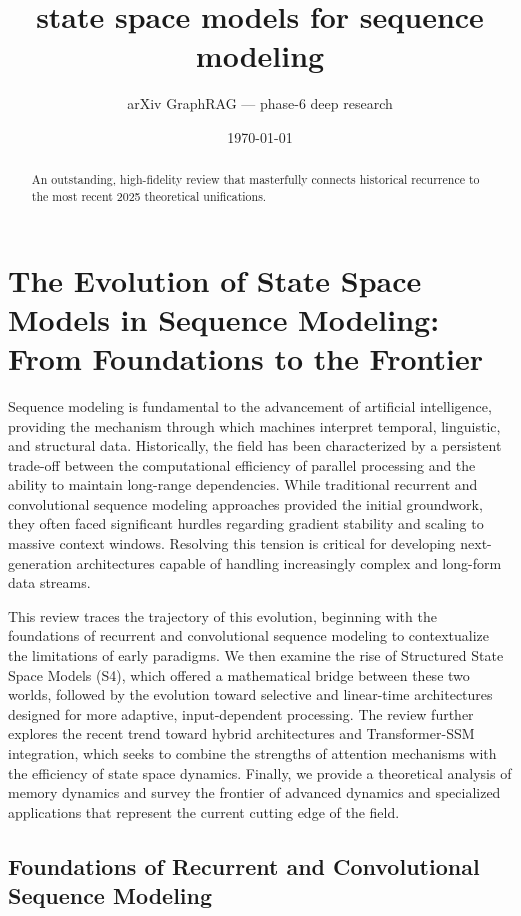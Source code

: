 \documentclass[11pt]{article}
\title{state space models for sequence modeling}
\author{arXiv GraphRAG --- phase-6 deep research}
\date{\today}
\begin{document}
\maketitle

\begin{abstract}
An outstanding, high-fidelity review that masterfully connects historical recurrence to the most recent 2025 theoretical unifications.
\end{abstract}

\section{The Evolution of State Space Models in Sequence Modeling: From Foundations to the Frontier}

Sequence modeling is fundamental to the advancement of artificial intelligence, providing the mechanism through which machines interpret temporal, linguistic, and structural data. Historically, the field has been characterized by a persistent trade-off between the computational efficiency of parallel processing and the ability to maintain long-range dependencies. While traditional recurrent and convolutional sequence modeling approaches provided the initial groundwork, they often faced significant hurdles regarding gradient stability and scaling to massive context windows. Resolving this tension is critical for developing next-generation architectures capable of handling increasingly complex and long-form data streams.

This review traces the trajectory of this evolution, beginning with the foundations of recurrent and convolutional sequence modeling to contextualize the limitations of early paradigms. We then examine the rise of Structured State Space Models (S4), which offered a mathematical bridge between these two worlds, followed by the evolution toward selective and linear-time architectures designed for more adaptive, input-dependent processing. The review further explores the recent trend toward hybrid architectures and Transformer-SSM integration, which seeks to combine the strengths of attention mechanisms with the efficiency of state space dynamics. Finally, we provide a theoretical analysis of memory dynamics and survey the frontier of advanced dynamics and specialized applications that represent the current cutting edge of the field.

\subsection{Foundations of Recurrent and Convolutional Sequence Modeling}
\end{document}
